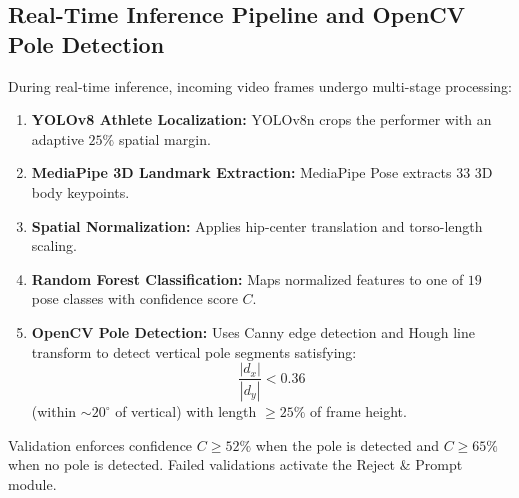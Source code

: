 \documentclass{ieeeaccess}
\begin{document}
\subsection{Real-Time Inference Pipeline and OpenCV Pole Detection}
During real-time inference, incoming video frames undergo multi-stage processing:
\begin{enumerate}
    \item \textbf{YOLOv8 Athlete Localization:} YOLOv8n \cite{b7} crops the performer with an adaptive $25\%$ spatial margin.
    \item \textbf{MediaPipe 3D Landmark Extraction:} MediaPipe Pose \cite{b14} extracts $33$ 3D body keypoints.
    \item \textbf{Spatial Normalization:} Applies hip-center translation and torso-length scaling.
    \item \textbf{Random Forest Classification:} Maps normalized features to one of $19$ pose classes with confidence score $C$.
    \item \textbf{OpenCV Pole Detection:} Uses Canny edge detection and Hough line transform to detect vertical pole segments satisfying:
    \begin{equation}
    \frac{|d_x|}{|d_y|} < 0.36
    \label{eq:pole_threshold}
    \end{equation}
    (within $\sim 20^{\circ}$ of vertical) with length $\ge 25\%$ of frame height.
\end{enumerate}
Validation enforces confidence $C \ge 52\%$ when the pole is detected and $C \ge 65\%$ when no pole is detected. Failed validations activate the Reject \& Prompt module.
\end{document}
